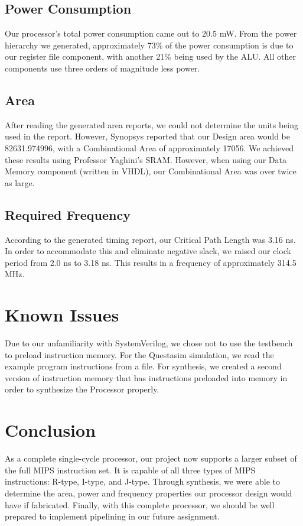 \documentclass{article}
\begin{document}
\subsection{Power Consumption}
Our processor's total power consumption came out to 20.5 mW. From the power hierarchy we generated, approximately 73\% of the power consumption is due to our register file component, with another 21\% being used by the ALU. All other components use three orders of magnitude less power.

\subsection{Area}
After reading the generated area reports, we could not determine the units being used in the report. However, Synopsys reported that our Design area would be 82631.974996, with a Combinational Area of approximately 17056. We achieved these results using Professor Yaghini's SRAM. However, when using our Data Memory component (written in VHDL), our Combinational Area was over twice as large.

\subsection{Required Frequency}
According to the generated timing report, our Critical Path Length was 3.16 ns. In order to accommodate this and eliminate negative slack, we raised our clock period from 2.0 ns to 3.18 ns. This results in a frequency of approximately 314.5 MHz.

\section{Known Issues} 
Due to our unfamiliarity with SystemVerilog, we chose not to use the testbench to preload instruction memory. For the Questasim simulation, we read the example program instructions from a file.  For synthesis, we created a second version of instruction memory that has instructions preloaded into memory in order to synthesize the Processor properly.
\\
\section{Conclusion}

As a complete single-cycle processor, our project now supports a larger subset of the full MIPS instruction set. It is capable of all three types of MIPS instructions: R-type, I-type, and J-type. Through synthesis, we were able to determine the area, power and frequency properties our processor design would have if fabricated. Finally, with this complete processor, we should be well prepared to implement pipelining in our future assignment.
\end{document}
